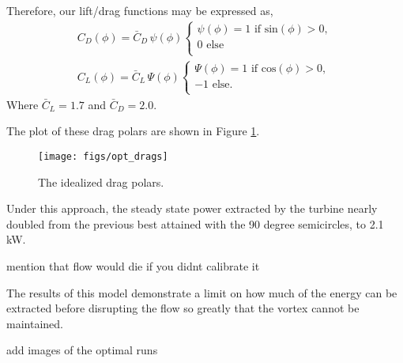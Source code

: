 Therefore, our lift/drag functions may be expressed as,
\begin{align*} 
 C_D(\phi) = \bar C_D \, \psi(\phi) 
  \begin{cases}
   \psi(\phi) = 1 \text{ if sin}(\phi) > 0,   \\
   0 \text{ else} \\
  \end{cases} \\
 C_L(\phi) = \bar C_L \, \Psi(\phi) 
  \begin{cases}
   \Psi(\phi) = 1 \text{ if cos}(\phi) > 0,   \\
   -1 \text{ else}. \\
  \end{cases}
\end{align*}
Where $\bar C_L = 1.7$ and $\bar C_D = 2.0$.

The plot of these drag polars are shown in Figure \ref{drags}. 

\begin{figure}[!htb]
  \begin{center}
    \texttt{[image: figs/opt\_drags]}
    \caption{The idealized drag polars.} 
    \label{drags}
  \end{center}
\end{figure}

Under this approach, the steady state power extracted by the
turbine nearly doubled from the previous best attained with the 90
degree semicircles, to 2.1 kW.

mention that flow would die if you didnt calibrate it


 The results of this model demonstrate a limit on how much of the energy
 can be extracted before disrupting the flow so greatly
 that the vortex cannot be maintained.

add images of the optimal runs